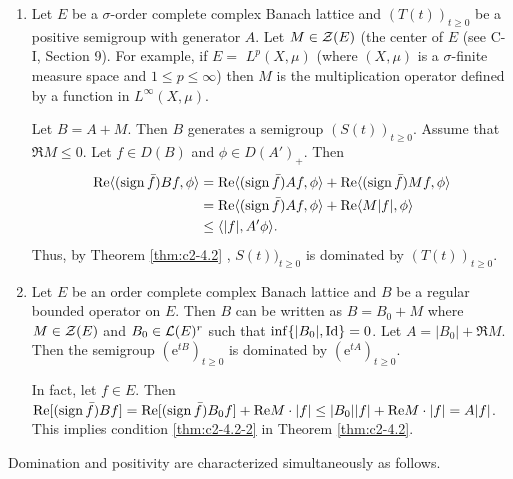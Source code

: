 \begin{example}\label{ex:c2-4.4} 
\begin{enumerate}[\upshape (i), wide, labelsep=.5em] %
\item \label{ex:c2-4.4-1}
Let $E$ be a $\sigma$-order complete complex Banach lattice and $(T(t))_{t \geq 0}$ be a positive semigroup with generator $A$. 
Let $M \in \mathcal{Z}(E)$ (the center of $E$ (see C-I, Section 9). 
For example, if $E =$ $L^{p}(X,\mu)$ (where $(X,\mu)$ is a $\sigma$-finite measure space and $1 \leq p \leq \infty$) then $M$ is the multiplication operator defined by a function in $L^{\infty}(X,\mu)$.

Let $B = A + M$. Then $B$ generates a semigroup $(S(t))_{t \geq 0}$.
Assume that $\Re M \leq 0$. Let $f \in D(B)$ and $\phi \in D(A')_{+}$. Then
\begin{align*}
\mathop{}\!\mathrm{Re}\langle(\operatorname{sign}  \bar{f})Bf,\phi\rangle &= \mathop{}\!\mathrm{Re}\langle(\operatorname{sign}  \bar{f})Af,\phi\rangle + \mathop{}\!\mathrm{Re}\langle(\operatorname{sign}  \bar{f})Mf,\phi\rangle\\
&= \mathop{}\!\mathrm{Re}\langle(\operatorname{sign}  \bar{f})Af,\phi\rangle + \mathop{}\!\mathrm{Re}\langle M|f|,\phi\rangle\\
&\leq \langle|f|,A'\phi\rangle.
\end{align*}
Thus, by Theorem \ref{thm:c2-4.2}  , $S(t))_{t \geq 0}$ is dominated by $(T(t))_{t \geq 0}$.
\item \label{ex:c2-4.4-2}
Let $E$ be an order complete complex Banach lattice and $B$ be a regular bounded operator on $E$. 
Then $B$ can be written as $B = B_{0} + M$ where $M \in \mathcal{Z}(E)$ and $B_{0} \in \mathcal{L}(E)^{r}$ such that $\inf \{|B_{0}|, \operatorname{Id}\} = 0$.
Let $A = |B_{0}| + \Re  M$. 
Then the semigroup $(\mathrm{e}^{tB})_{t \geq 0}$ is dominated by $(\mathrm{e}^{tA})_{t \geq 0}$.

In fact, let $f \in E$. Then \\
$\mathop{}\!\mathrm{Re}[(\operatorname{sign}  \bar{f})Bf] = \mathop{}\!\mathrm{Re}[(\operatorname{sign} \bar{f})B_{0}f] + \mathop{}\!\mathrm{Re} M \cdot |f| \leq |B_{0}||f| + \mathop{}\!\mathrm{Re} M \cdot |f| = A|f|$. \\
This implies condition \ref{thm:c2-4.2-2} in Theorem \ref{thm:c2-4.2}.
\end{enumerate}
\end{example}

Domination and positivity are characterized simultaneously as
follows.

